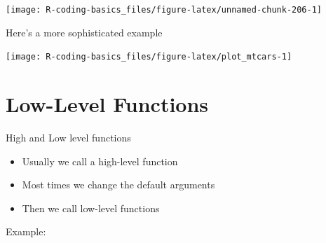 \documentclass[
]{book}
\newenvironment{Shaded}{\begin{snugshade}}{\end{snugshade}}
\newcommand{\AttributeTok}[1]{\textcolor[rgb]{0.77,0.63,0.00}{#1}}
\newcommand{\CommentTok}[1]{\textcolor[rgb]{0.56,0.35,0.01}{\textit{#1}}}
\newcommand{\DecValTok}[1]{\textcolor[rgb]{0.00,0.00,0.81}{#1}}
\newcommand{\FloatTok}[1]{\textcolor[rgb]{0.00,0.00,0.81}{#1}}
\newcommand{\FunctionTok}[1]{\textcolor[rgb]{0.00,0.00,0.00}{#1}}
\newcommand{\NormalTok}[1]{#1}
\newcommand{\SpecialCharTok}[1]{\textcolor[rgb]{0.00,0.00,0.00}{#1}}
\newcommand{\StringTok}[1]{\textcolor[rgb]{0.31,0.60,0.02}{#1}}
\begin{document}
\begin{center}\texttt{[image: R-coding-basics\_files/figure-latex/unnamed-chunk-206-1]} \end{center}

Here's a more sophisticated example

\begin{Shaded}
\end{Shaded}

\begin{center}\texttt{[image: R-coding-basics\_files/figure-latex/plot\_mtcars-1]} \end{center}

\hypertarget{low-level-functions}{%
\section{Low-Level Functions}\label{low-level-functions}}

High and Low level functions

\begin{itemize}
\item
  Usually we call a high-level function
\item
  Most times we change the default arguments
\item
  Then we call low-level functions
\end{itemize}

Example:
\end{document}
